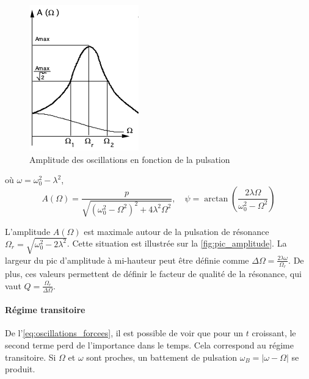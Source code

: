 \begin{figure}
    \vspace*{-0.5cm}
    \centering
    \includegraphics[width=\linewidth]{figures/pic_amplitude.png}
    \caption{Amplitude des oscillations en fonction de la pulsation \cite{notice}}
    \label{fig:pic_amplitude}
    \vspace*{-2cm}
\end{figure}
où \(\omega = \omega_0^2 - \lambda^2\), 
\begin{equation}
    A(\Omega) = \frac{p}{\sqrt{\left(\omega_0^2-\Omega^2\right)^2 + 4\lambda^2\Omega^2}}, \quad \psi = \arctan \left(\frac{2\lambda\Omega}{\omega_0^2-\Omega^2}\right)
\end{equation}

L'amplitude \(A(\Omega)\) est maximale autour de la pulsation de résonance \(\Omega_r = \sqrt{\omega_0^2-2\lambda^2}\). Cette situation est illustrée sur la \autoref{fig:pic_amplitude}. La largeur du pic d'amplitude à mi-hauteur peut être définie comme \(\Delta \Omega = \frac{2 \lambda \omega}{\Omega_r}\). De plus, ces valeurs permettent de définir le facteur de qualité de la résonance, qui vaut \(Q = \frac{\Omega_r}{\Delta\Omega}\).

\paragraph*{Régime transitoire}
De l'\autoref{eq:oscillations_forcees}, il est possible de voir que pour un \(t\) croissant, le second terme perd de l'importance dans le temps. Cela correspond au régime transitoire. Si \(\Omega\) et \(\omega\) sont proches, un battement de pulsation \(\omega_B = |\omega- \Omega|\) se produit.
